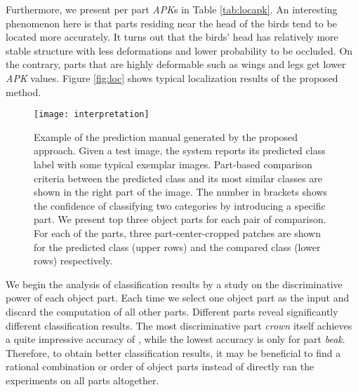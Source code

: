 \documentclass[10pt,twocolumn,letterpaper]{article}
\begin{document}
Furthermore, we present per part \emph{APK}s in Table \ref{tab:locapk}. An interesting phenomenon here is that parts residing near the head of the birds tend to be located more accurately. It turns out that the birds' head has relatively more stable structure with less deformations and lower probability to be occluded. On the contrary, parts that are highly deformable such as wings and legs get lower \emph{APK} values. Figure \ref{fig:loc} shows typical localization results of the proposed method.

\begin{figure*}[t]
\begin{center}
\texttt{[image: interpretation]}
\end{center}
   \caption{Example of the prediction manual generated by the proposed approach. Given a test image, the system reports its predicted class label with some typical exemplar images. Part-based comparison criteria between the predicted class and its most similar classes are shown in the right part of the image. The number in brackets shows the confidence of classifying two categories by introducing a specific part. We present top three object parts for each pair of comparison. For each of the parts, three part-center-cropped patches are shown for the predicted class (upper rows) and the compared class (lower rows) respectively.}
\label{fig:interpret}
\end{figure*}











We begin the analysis of classification results by a study on the discriminative power of each object part. Each time we select one object part as the input and discard the computation of all other parts. Different parts reveal significantly different classification results. The most discriminative part \emph{crown} itself achieves a quite impressive accuracy of , while the lowest accuracy is only  for part \emph{beak}. Therefore, to obtain better classification results, it may be beneficial to find a rational combination or order of object parts instead of directly ran the experiments on all parts altogether.
\end{document}
